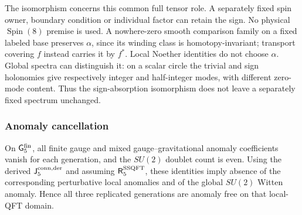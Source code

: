 \documentclass[12pt,a4paper]{article}
\begin{document}
The isomorphism concerns this common full tensor role.
A separately fixed spin owner, boundary condition or
individual factor can retain the sign.  No physical
\(\operatorname{Spin}(8)\) premise is used.
A nowhere-zero smooth comparison family on a fixed
labeled base preserves \(\alpha\), since its winding
class is homotopy-invariant; transport covering \(f\)
instead carries it by \(f^*\).
Local Noether identities do not choose \(\alpha\).
Global spectra can distinguish it: on a scalar circle
the trivial and sign holonomies give respectively
integer and half-integer modes, with different
zero-mode content.  Thus the sign-absorption isomorphism
does not leave a separately fixed spectrum unchanged.


\subsubsection{Anomaly cancellation}
\label{p5:sec:part1-anomalies}

\begin{theorem}
\label{p5:thm:part1-anomaly-cancellation}
On \(\mathsf G_5^{\rm fin}\), all finite gauge and mixed
gauge--gravitational anomaly coefficients vanish for each generation, and
the \(SU(2)\) doublet count is even.  Using the derived
\(\mathsf J_5^{\rm conn,der}\) and assuming
\(\mathsf R_5^{\rm SSQFT}\), these identities imply
absence of the corresponding perturbative local anomalies and of the global
\(SU(2)\) Witten anomaly.  Hence all three replicated generations are anomaly
free on that local-QFT domain.
\end{theorem}
\end{document}
